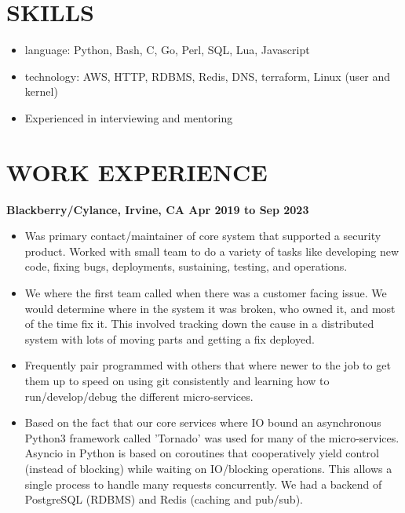 \documentclass{res}
\begin{document}

\address{john@jjdev.com - (657) 400 9422 - Westminster, CA 92683}

\begin{resume}
  \section{SKILLS}

  \begin{itemize}

  \item
    language: Python, Bash, C, Go, Perl, SQL, Lua, Javascript
  \item
      technology: AWS, HTTP, RDBMS, Redis, DNS, terraform, Linux (user and kernel)
  \item
      Experienced in interviewing and mentoring
  \end{itemize}

  \section{WORK EXPERIENCE}

  {\large \bf Blackberry/Cylance, Irvine, CA \hfill Apr 2019 to Sep 2023}
  \begin{itemize}
  \item
    Was primary contact/maintainer of core system that supported a
    security product.  Worked with small team to do a variety of tasks
    like developing new code, fixing bugs, deployments, sustaining,
    testing, and operations.

  \item
    We where the first team called when there was a customer facing
    issue. We would determine where in the system it was broken, who
    owned it, and most of the time fix it.  This involved tracking down
    the cause in a distributed system with lots of moving parts and
    getting a fix deployed.

  \item
    Frequently pair programmed with others that where newer to the job
    to get them up to speed on using git consistently and learning how
    to run/develop/debug the different micro-services.

  \item
Based on the fact that our core services where IO bound
an asynchronous Python3 framework called 'Tornado' was used for many
of the micro-services. Asyncio in Python is based on coroutines that
cooperatively yield control (instead of blocking) while waiting on
IO/blocking operations. This allows a single process to handle many
requests concurrently.  We had a backend of PostgreSQL (RDBMS) and Redis
(caching and pub/sub).


\end{itemize}
\end{resume}
\end{document}
